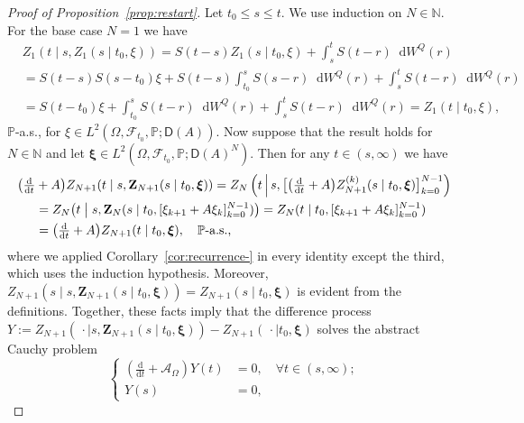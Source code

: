 \documentclass[reqno]{amsart}
\numberwithin{equation}{section}
\newcommand{\bbP}{\mathbb{P}}
\newcommand{\N}{\mathbb{N}}
\newcommand{\cA}{\mathcal{A}}
\newcommand{\cF}{\mathcal{F}}
\newcommand{\rd}{\mathop{}\!\mathrm{d}}
\theoremstyle{remark}
\theoremstyle{definition}
\begin{document}
\begin{proof}[Proof of Proposition~\ref{prop:restart}]
	Let $t_0 \le s \le t$.
	We use induction on $N\in \N$. For the base case $N=1$ we have
	\begin{equation*}\begin{aligned}
			&Z_1(t \mid s, Z_1(s \mid t_0, \xi) ) 
			= S(t-s)Z_1(s \mid t_0, \xi) + \int_{s}^t S(t-r)\rd W^Q(r) 
			\\
			&= 
			S(t-s)S(s-t_0)\xi + S(t-s)\int_{t_0}^{s} S(s-r)\rd W^Q(r) + \int_{s}^t S(t-r)\rd W^Q(r)
			\\
			&= 
			S(t-t_0)\xi + \int_{t_0}^{s} S(t-r)\rd W^Q(r) + \int_{s}^t S(t-r)\rd W^Q(r)
			=
			Z_1(t \mid t_0, \xi),
		\end{aligned}
	\end{equation*}
	$\bbP$-a.s., for $\xi \in L^2(\Omega, \cF_{t_0}, \bbP; \mathsf D(A))$.
	Now suppose that the result holds for $N \in \N$ and
	let $\bm\xi \in L^2(\Omega, \cF_{t_0}, \bbP; \mathsf D(A)^N)$.
	Then for any $t \in (s, \infty)$ we have
	\begin{align*}
		\bigl(\tfrac{\mathrm d}{\mathrm dt} &+ A\bigr) Z_{N+1} (t \mid s, \mathbf Z_{N+1}(s \mid t_0, \bm\xi))
		=
		Z_{N}\left(t \, \middle\vert \, s, \bigl[\bigl(\tfrac{\mathrm d}{\mathrm dt} + A\bigr)Z_{N+1}^{(k)}(s \mid t_0, \bm\xi)\bigr]_{k=0}^{N-1}\right)
		\\
		&=
		Z_{N}\bigl(t \bigm\vert s, {\mathbf Z}_{N}(s \mid t_0, [\xi_{k+1} + A\xi_k]_{k=0}^{N-1})\bigr)
		=
		Z_{N}(t \mid t_0, [\xi_{k+1} + A\xi_k]_{k=0}^{N-1})
		\\&=
		\bigl(\tfrac{\mathrm d}{\mathrm dt} + A\bigr) Z_{N+1} (t \mid t_0, \bm\xi), \quad \text{$\bbP$-a.s.,}
	\end{align*}
	where we applied Corollary~\ref{cor:recurrence-}
	in every identity except the third, which uses the induction hypothesis.
	Moreover, $Z_{N+1} (s \mid s, \mathbf Z_{N+1}(s \mid t_0, \bm\xi))
	=
	Z_{N+1}(s \mid t_0, \bm\xi)$ is evident from the definitions.
	Together, these facts imply that the difference process
	$Y := Z_{N+1} (\,\cdot \mid s, \mathbf Z_{N+1}(s \mid t_0, \bm\xi)) - Z_{N+1} (\,\cdot \mid t_0, \bm\xi)$
	solves the abstract Cauchy problem
	\begin{equation}
		\left\lbrace\begin{aligned}
			\left(\tfrac{\mathrm d}{\mathrm d t} + \cA_{\Omega}\right)Y(t) &= 0, \quad \forall t \in (s, \infty); \\
			Y(s) &= 0,
		\end{aligned}\right.

\end{equation}
\end{proof}
\end{document}
